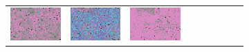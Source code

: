 \documentclass{ipol}
\begin{document}
\begin{figure}[ht]
\begin{subfigure}[t]{\linewidth}
\begin{tabular}{ccccccccc}
                \includegraphics[width=\s]{images/carnival/DCB/bid_j98_64_grids.png}&
                \includegraphics[width=\s]{images/carnival/DHT/bid_j98_64_grids.png}&
                \includegraphics[width=\s]{images/carnival/LINEAR/bid_j98_64_grids.png}&

\end{tabular}
\end{subfigure}
\end{figure}
\end{document}
